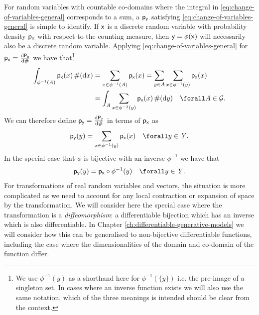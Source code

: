 For random variables with countable co-domains where the integral in \eqref{eq:change-of-variables-general} corresponds to a sum, a $\mathsf{p}_{\mathsf{y}}$ satisfying \eqref{eq:change-of-variables-general} is simple to identify. If $\mathsf{x}$ is a discrete random variable with probability density $\mathsf{p}_{\mathsf{x}}$ with respect to the counting measure, then $\mathsf{y} = \phi(\mathsf{x})$ will necessarily also be a discrete random variable. Applying \eqref{eq:change-of-variables-general} for $\mathsf{p}_{\mathsf{x}} = \frac{\mathrm{d} \mathsf{P}_{\mathsf{x}}}{\mathrm{d} \#}$ we have that\footnote{We use $\phi^{-1}(y)$ as a shorthand here for $\phi^{-1}(\lbrace y \rbrace)$ i.e. the pre-image of a singleton set. In cases where an inverse function exists we will also use the same notation, which of the three meanings is intended should be clear from the context.} 
\begin{align}\label{eq:change-of-variables-discrete-derivation}
  \int_{\phi^{-1}(\set{A})} \pden{\rvar{x}}(x) \,\countm(\dr x) &= 
  \sum_{x\in\phi^{-1}(\set{A})} \pden{\rvar{x}}(x)  =
  \sum_{y \in \set{A}} \sum_{x\in\phi^{-1}(y)} \pden{\rvar{x}}(x) \nonumber \\
  &= \int_{\set{A}} \sum_{x\in\phi^{-1}(y)} \pden{\rvar{x}}(x) \,\countm(\dr y)
  \quad \forall \set{A} \in \sset{G}.
\end{align}
We can therefore define $\mathsf{p}_{\mathsf{y}} = \frac{\mathrm{d} \mathsf{P}_{\mathsf{y}}}{\mathrm{d} \#}$ in terms of $\mathsf{p}_{\mathsf{x}}$ as
\begin{equation}\label{eq:change-of-variables-discrete}
  \pden{\rvar{y}}(y) = \sum_{x \in \phi^{-1}(y)} \pden{\rvar{x}}(x)
  \quad \forall y \in \set{Y}.
\end{equation}
In the special case that $\phi$ is bijective with an inverse $\phi^{-1}$ we have that 
\begin{equation}\label{eq:change-of-variables-discrete-bijective}
  \pden{\rvar{y}}(y) = \pden{\rvar{x}}\circ\phi^{-1}(y)
  \quad \forall y \in \set{Y}.
\end{equation}
For transformations of real random variables and vectors, the situation is more complicated as we need to account for any local contraction or expansion of space by the transformation. We will consider here the special case where the transformation is a \emph{diffeomorphism}: a differentiable bijection which has an inverse which is also differentiable. In Chapter \ref{ch:differentiable-generative-models} we will consider how this can be generalised to non-bijective differentiable functions, including the case where the dimensionalities of the domain and co-domain of the function differ.

